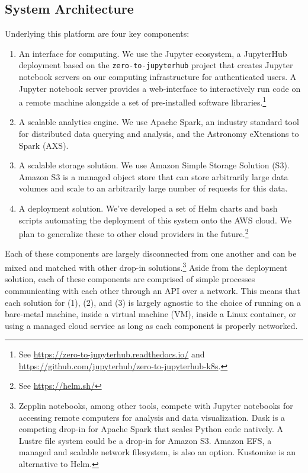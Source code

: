 \documentclass[twocolumn, linenumbers]{aastex631}
\begin{document}
\subsection{System Architecture}
\label{sec:arch}

Underlying this platform are four key components: 
\begin{enumerate}
    \item An interface for computing. We use the Jupyter ecosystem, a JupyterHub deployment based on the \texttt{zero-to-jupyterhub} project that creates Jupyter notebook servers on our computing infrastructure for authenticated users. A Jupyter notebook server provides a web-interface to interactively run code on a remote machine alongside a set of pre-installed software libraries.\footnote{See \url{https://zero-to-jupyterhub.readthedocs.io/} and \url{https://github.com/jupyterhub/zero-to-jupyterhub-k8s}.}
    \item A scalable analytics engine. We use Apache Spark, an industry standard tool for distributed data querying and analysis, and the Astronomy eXtensions to Spark (AXS).
    \item A scalable storage solution. We use Amazon Simple Storage Solution (S3). Amazon S3 is a managed object store that can store arbitrarily large data volumes and scale to an arbitrarily large number of requests for this data.
    \item A deployment solution. We've developed a set of Helm charts and bash scripts automating the deployment of this system onto the AWS cloud. We plan to generalize these to other cloud providers in the future.\footnote{See \url{https://helm.sh/}}
\end{enumerate}

Each of these components are largely disconnected from one another and can be mixed and matched with other drop-in solutions.\footnote{Zepplin notebooks, among other tools, compete with Jupyter notebooks for accessing remote computers for analysis and data visualization. Dask is a competing drop-in for Apache Spark that scales Python code natively. A Lustre file system could be a drop-in for Amazon S3. Amazon EFS, a managed and scalable network filesystem, is also an option. Kustomize is an alternative to Helm.} Aside from the deployment solution, each of these components are comprised of simple processes communicating with each other through an API over a network. This means that each solution for (1), (2), and (3) is largely agnostic to the choice of running on a bare-metal machine, inside a virtual machine (VM), inside a Linux container, or using a managed cloud service as long as each component is properly networked.
\end{document}
